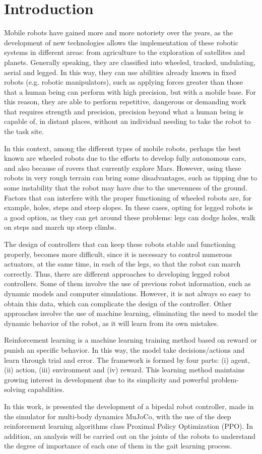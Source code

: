
\section{Introduction}
Mobile robots have gained more and more notoriety over the years, as the development of new technologies allows the implementation of these robotic systems in different areas: from agriculture to the exploration of satellites and planets. Generally speaking, they are classified into wheeled, tracked, undulating, aerial and legged. In this way, they can use abilities already known in fixed robots (e.g. robotic manipulators), such as applying forces greater than those that a human being can perform with high precision, but with a mobile base. For this reason, they are able to perform repetitive, dangerous or demanding work that requires strength and precision, precision beyond what a human being is capable of, in distant places, without an individual needing to take the robot to the task site.

In this context, among the different types of mobile robots, perhaps the best known are wheeled robots due to the efforts to develop fully autonomous cars, and also because of rovers that currently explore Mars. However, using these robots in very rough terrain can bring some disadvantages, such as tipping due to some instability that the robot may have due to the unevenness of the ground. Factors that can interfere with the proper functioning of wheeled robots are, for example, holes, steps and steep slopes. In these cases, opting for legged robots is a good option, as they can get around these problems: legs can dodge holes, walk on steps and march up steep climbs.

The design of controllers that can keep these robots stable and functioning properly, becomes more difficult, since it is necessary to control numerous actuators, at the same time, in each of the legs, so that the robot can march correctly. Thus, there are different approaches to developing legged robot controllers. Some of them involve the use of previous robot information, such as dynamic models and computer simulations. However, it is not always so easy to obtain this data, which can complicate the design of the controller. Other approaches involve the use of machine learning, eliminating the need to model the dynamic behavior of the robot, as it will learn from its own mistakes.

Reinforcement learning is a machine learning training method based on reward or punish an specific behavior. In this way, the model take decisions/actions and learn through trial and error. The framework is formed by four parts: (i) agent, (ii) action, (iii) environment and (iv) reward. This learning method maintains growing interest in development due to its simplicity and powerful problem-solving capabilities.

In this work, is presented the development of a bipedal robot controller, made in the simulator for multi-body dynamics MuJoCo, with the use of the deep reinforcement learning algorithms class Proximal Policy Optimization (PPO). In addition, an analysis will be carried out on the joints of the robots to understand the degree of importance of each one of them in the gait learning process.
